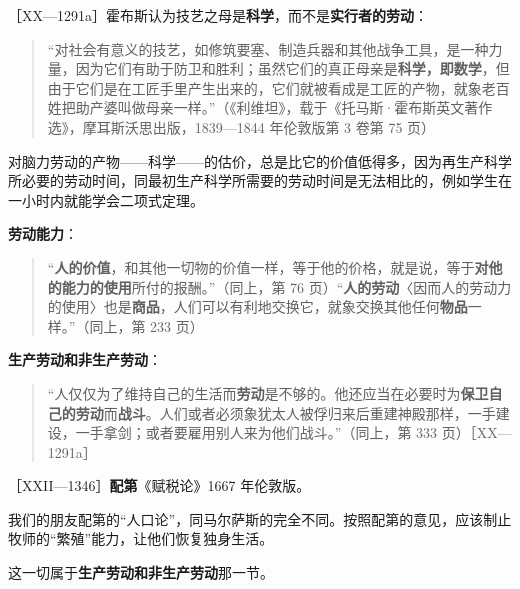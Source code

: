 

［XX—1291a］霍布斯认为技艺之母是\textbf{科学}，而不是\textbf{实行者的劳动}：

\begin{quote}“对社会有意义的技艺，如修筑要塞、制造兵器和其他战争工具，是一种力量，因为它们有助于防卫和胜利；虽然它们的真正母亲是\textbf{科学，即数学}，但由于它们是在工匠手里产生出来的，它们就被看成是工匠的产物，就象老百姓把助产婆叫做母亲一样。”（《利维坦》，载于《托马斯·霍布斯英文著作选》，摩耳斯沃思出版，1839—1844 年伦敦版第 3 卷第 75 页）\end{quote}

对脑力劳动的产物——科学——的估价，总是比它的价值低得多，因为再生产科学所必要的劳动时间，同最初生产科学所需要的劳动时间是无法相比的，例如学生在一小时内就能学会二项式定理。

\textbf{劳动能力}：

\begin{quote}“\textbf{人的价值}，和其他一切物的价值一样，等于他的价格，就是说，等于\textbf{对他的能力的使用}所付的报酬。”（同上，第 76 页）“\textbf{人的劳动}〈因而人的劳动力的使用〉也是\textbf{商品}，人们可以有利地交换它，就象交换其他任何\textbf{物品}一样。”（同上，第 233 页）\end{quote}

\textbf{生产劳动和非生产劳动}：

\begin{quote}“人仅仅为了维持自己的生活而\textbf{劳动}是不够的。他还应当在必要时为\textbf{保卫自己的劳动}而\textbf{战斗}。人们或者必须象犹太人被俘归来后重建神殿那样，一手建设，一手拿剑；或者要雇用别人来为他们战斗。”（同上，第 333 页）［XX—1291a］\end{quote}



［XXII—1346］\textbf{配第}《赋税论》1667 年伦敦版。

我们的朋友配第的“人口论”，同马尔萨斯的完全不同。按照配第的意见，应该制止牧师的“繁殖”能力，让他们恢复独身生活。

这一切属于\textbf{生产劳动和非生产劳动}那一节。

